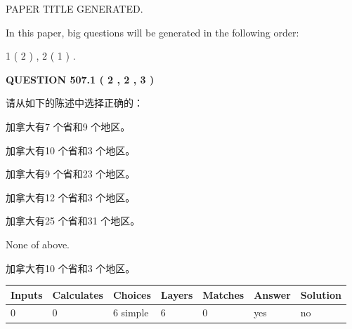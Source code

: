 \documentclass{ctexart}
\begin{document}
   
\vspace{0.2in}
   
   
   
   
   
   
   
   
 \vspace{0.2in}
 
 
 
 
   
   
 PAPER TITLE GENERATED.
   
   
   
\vspace{0.2in}
   
In this paper, big questions will be generated in the following order: 
   
   
   1 ( 2 )
 ,
   2 ( 1 )
 .
  
\vspace{0.2in}
  
{\textbf{\Large{QUESTION
507.1 
 ( 2 , 2 , 3 )
}}}
  
  
请从如下的陈述中选择正确的：
 
 
加拿大有7 个省和9 个地区。
 
 
加拿大有10 个省和3 个地区。
 
 
加拿大有9 个省和23 个地区。
 
 
加拿大有12 个省和3 个地区。
 
 
加拿大有25 个省和31 个地区。
 
 
 None of above.
 
 
\noindent{}
 
 
加拿大有10 个省和3 个地区。
 
 
\noindent{}
 
 
   
   
   
   
\noindent\begin{tabular}{|l|l|l|l|l|l|l|}
 \hline
Inputs & Calculates & Choices & Layers & Matches & Answer & Solution \\ \hline
 0  & 
 0  & 
 6
  simple  
  & 
 6  & 
 0  & 
  yes & 
  no 
  \\ \hline
 \end{tabular}
   
\end{document}
